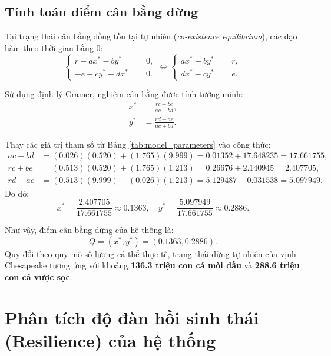 \subsection{Tính toán điểm cân bằng dừng}
Tại trạng thái cân bằng đồng tồn tại tự nhiên (\textit{co-existence equilibrium}), các đạo hàm theo thời gian bằng 0:
\begin{equation}
\left\{
\begin{aligned}
r - ax^* - by^* &= 0, \\
-e - cy^* + dx^* &= 0.
\end{aligned}
\right.
\iff
\left\{
\begin{aligned}
ax^* + by^* &= r, \\
dx^* - cy^* &= e.
\end{aligned}
\right.
\end{equation}

Sử dụng định lý Cramer, nghiệm cân bằng được tính tường minh:
\begin{align}
x^* &= \frac{rc + be}{ac + bd}, \label{eq:eq_x_star} \\
y^* &= \frac{rd - ae}{ac + bd}. \label{eq:eq_y_star}
\end{align}

Thay các giá trị tham số từ Bảng \ref{tab:model_parameters} vào công thức:
\begin{align*}
ac + bd &= (0.026)(0.520) + (1.765)(9.999) = 0.01352 + 17.648235 = 17.661755, \\
rc + be &= (0.513)(0.520) + (1.765)(1.213) = 0.26676 + 2.140945 = 2.407705, \\
rd - ae &= (0.513)(9.999) - (0.026)(1.213) = 5.129487 - 0.031538 = 5.097949.
\end{align*}
Do đó:
\begin{equation}
x^* = \frac{2.407705}{17.661755} \approx 0.1363, \quad 
y^* = \frac{5.097949}{17.661755} \approx 0.2886.
\end{equation}

Như vậy, điểm cân bằng dừng của hệ thống là:
\begin{equation}
Q = (x^*, y^*) = (0.1363, 0.2886).
\end{equation}
Quy đổi theo quy mô số lượng cá thể thực tế, trạng thái dừng tự nhiên của vịnh Chesapeake tương ứng với khoảng \textbf{136.3 triệu con cá mòi dầu} và \textbf{288.6 triệu con cá vược sọc}.

\section{Phân tích độ đàn hồi sinh thái (Resilience) của hệ thống}
\label{sec:model_resilience}

